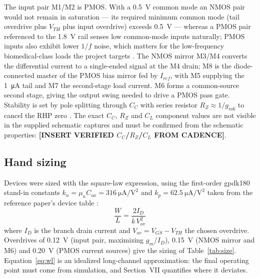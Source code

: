 \documentclass[conference]{IEEEtran}
\begin{document}
The input pair M1/M2 is PMOS. With a \SI{0.5}{\volt} common mode an NMOS pair
would not remain in saturation --- its required minimum common mode (tail
overdrive plus $V_{TH}$ plus input overdrive) exceeds \SI{0.5}{\volt} ---
whereas a PMOS pair referenced to the \SI{1.8}{\volt} rail senses low
common-mode inputs naturally; PMOS inputs also exhibit lower $1/f$ noise,
which matters for the low-frequency biomedical-class loads the project
targets \cite{razavi}. The NMOS mirror M3/M4 converts the differential
current to a single-ended signal at the M4 drain; M8 is the diode-connected
master of the PMOS bias mirror fed by $I_{ref}$, with M5 supplying the
\SI{1}{\micro\ampere} tail and M7 the second-stage load current. M6 forms a
common-source second stage, giving the output swing needed to drive a PMOS
pass gate. Stability is set by pole splitting through $C_C$ with series
resistor $R_Z \approx 1/g_{m6}$ to cancel the RHP zero \cite{gray,allen}. The
exact $C_C$, $R_Z$ and $C_L$ component values are not visible in the supplied
schematic captures and must be confirmed from the schematic properties:
\textbf{[INSERT VERIFIED $C_C$/$R_Z$/$C_L$ FROM CADENCE]}.

\subsection{Hand sizing}
Devices were sized with the square-law expression, using the first-order
gpdk180 stand-in constants $k_n = \mu_n C_{ox} =
\SI{316}{\micro\ampere\per\volt\squared}$ and $k_p =
\SI{62.5}{\micro\ampere\per\volt\squared}$ taken from the reference paper's
device table \cite{patel2017}:
\begin{equation}
\frac{W}{L} = \frac{2 I_D}{k \, V_{ov}^2}
\label{eq:wl}
\end{equation}
where $I_D$ is the branch drain current and $V_{ov} = V_{GS}-V_{TH}$ the
chosen overdrive. Overdrives of \SI{0.12}{\volt} (input pair, maximizing
$g_m/I_D$), \SI{0.15}{\volt} (NMOS mirror and M6) and \SI{0.20}{\volt} (PMOS
current sources) give the sizing of Table~\ref{tab:size}.
Equation~\eqref{eq:wl} is an idealized long-channel approximation: the final
operating point must come from simulation, and Section~VII quantifies where
it deviates.
\end{document}
